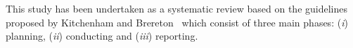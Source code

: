 This study has been undertaken as a systematic review based on the guidelines proposed by Kitchenham and Brereton~\cite{Kitchenham} which consist of three main phases: (\textit{i}) planning, (\textit{ii}) conducting and (\textit{iii}) reporting. %

